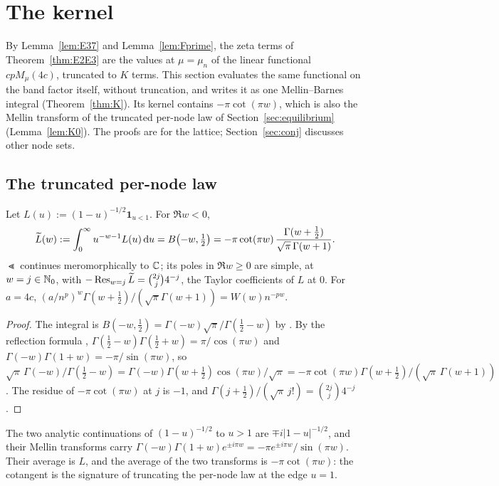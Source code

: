 \section{The kernel}\label{sec:kernel}

By Lemma~\ref{lem:E37} and Lemma~\ref{lem:Fprime}, the zeta terms of Theorem~\ref{thm:E2E3} are the values at
$\mu=\mu_n$ of the linear functional $cpM_\mu(4c)$, truncated to $K$ terms. This section evaluates the same functional on
the band factor itself, without truncation, and writes it as one Mellin--Barnes integral (Theorem~\ref{thm:K}). Its
kernel contains $-\pi\cot(\pi w)$, which is also the Mellin transform of the truncated per-node law of
Section~\ref{sec:equilibrium} (Lemma~\ref{lem:K0}). The proofs are for the lattice; Section~\ref{sec:conj} discusses
other node sets.

\subsection{The truncated per-node law}\label{sec:K0}
\begin{lemma}\label{lem:K0}
Let $L(u):=(1-u)^{-1/2}\mathbf 1_{u<1}$. For $\Re w<0$,
\[
  \widetilde L(w):=\int_0^\infty u^{-w-1}L(u)\,\mathrm{d} u=B\bigl(-w,\tfrac12\bigr)
  =-\pi\cot(\pi w)\,\frac{\Gamma(w+\frac12)}{\sqrt\pi\,\Gamma(w+1)} .
\]
$\Lt$ continues meromorphically to $\mathbb{C}$; its poles in $\Re w\ge0$ are simple, at $w=j\in\mathbb{N}_0$, with
$-\operatorname{Res}_{w=j}\widetilde L=\binom{2j}j4^{-j}$, the Taylor coefficients of $L$ at $0$. For $a=4c$,
$(a/n^p)^w\Gamma(w+\frac12)/(\sqrt\pi\Gamma(w+1))=W(w)n^{-pw}$.
\end{lemma}

\begin{proof}
The integral is $B(-w,\frac12)=\Gamma(-w)\sqrt\pi/\Gamma(\frac12-w)$ by \cite[(5.12.1)]{DLMF}. By the reflection formula
\cite[(5.5.3)]{DLMF}, $\Gamma(\frac12-w)\Gamma(\frac12+w)=\pi/\cos(\pi w)$ and $\Gamma(-w)\Gamma(1+w)=-\pi/\sin(\pi w)$, so
$\sqrt\pi\,\Gamma(-w)/\Gamma(\frac12-w)=\Gamma(-w)\Gamma(w+\frac12)\cos(\pi w)/\sqrt\pi=-\pi\cot(\pi w)\Gamma(w+\frac12)/(\sqrt\pi\,\Gamma(w+1))$.
The residue of $-\pi\cot(\pi w)$ at $j$ is $-1$, and $\Gamma(j+\frac12)/(\sqrt\pi\,j!)=\binom{2j}j4^{-j}$.
\end{proof}

The two analytic continuations of $(1-u)^{-1/2}$ to $u>1$ are $\mp i|1-u|^{-1/2}$, and their Mellin transforms carry
$\Gamma(-w)\Gamma(1+w)e^{\pm i\pi w}=-\pi e^{\pm i\pi w}/\sin(\pi w)$. Their average is $L$, and the average of the two
transforms is $-\pi\cot(\pi w)$: the cotangent is the signature of truncating the per-node law at the edge $u=1$.

